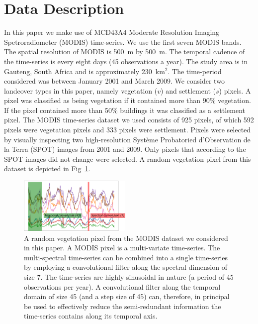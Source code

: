 \documentclass{article}
\begin{document}
\section{Data Description}
\label{sec:data}
In this paper we make use of MCD43A4 Moderate Resolution Imaging Spetroradiometer (MODIS) time-series. We use the first seven MODIS bands. The spatial resolution of MODIS is 500~m by 500~m. The temporal cadence of the time-series is every eight days (45 observations a year). The study area is in Gauteng, South Africa and is approximately 230~km$^2$. The time-period considered was between January 2001 and March 2009. We consider two landcover types in this paper, namely vegetation ($v$) and settlement ($s$) pixels. A pixel was classified as being vegetation if it contained more than 90\% vegetation. If the pixel contained more than 50\% buildings it was classified as a settlement pixel. 
The MODIS time-series dataset we used consists of 925 pixels, of which 592 pixels were vegetation pixels and 333 pixels were settlement. Pixels were selected by visually inspecting two high-resolution Syst\`{e}me Probatoried d'Observation de la Terra (SPOT) images from 2001 and 2009. Only pixels that according to the SPOT images did not change were selected. A random vegetation pixel from this dataset is depicted in Fig~\ref{fig:mv_series}. 

\begin{figure}
  \includegraphics[width=0.48\textwidth]{time_series-crop.pdf}
  \caption{A random vegetation pixel from the MODIS dataset we considered in this paper. A MODIS pixel is a multi-variate time-series. The multi-spectral time-series can be combined into a single time-series by employing a convolutional filter along the spectral dimension of size 7. The time-series are highly sinusoidal in nature (a period of 45 observations per year). A convolutional filter along the temporal domain of size 45 (and a step size of 45) can, therefore, in principal be used to effectively reduce the semi-redundant information the time-series contains along its temporal axis.}
 \label{fig:mv_series} 
 \end{figure}
 
\end{document}
